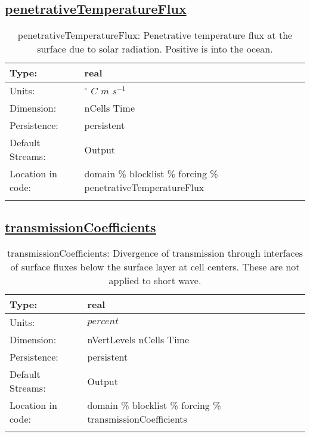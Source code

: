 \subsection[penetrativeTemperatureFlux]{\hyperref[sec:var_tab_forcing]{penetrativeTemperatureFlux}}
\label{subsec:var_sec_forcing_penetrativeTemperatureFlux}
\begin{center}
\begin{longtable}{| p{2.0in} | p{4.0in} |}
        \hline 
        Type: & real \\
        \hline 
        Units: & $^\circ$ $C$ $m$ $s^{-1}$ \\
        \hline 
        Dimension: & nCells Time \\
        \hline 
        Persistence: & persistent \\
        \hline 
		 Default Streams: & Output  \\
        \hline 
		 Location in code: & domain \% blocklist \% forcing \% penetrativeTemperatureFlux \\
		 \hline 
    \caption{penetrativeTemperatureFlux: Penetrative temperature flux at the surface due to solar radiation. Positive is into the ocean.}
\end{longtable}
\end{center}
\subsection[transmissionCoefficients]{\hyperref[sec:var_tab_forcing]{transmissionCoefficients}}
\label{subsec:var_sec_forcing_transmissionCoefficients}
\begin{center}
\begin{longtable}{| p{2.0in} | p{4.0in} |}
        \hline 
        Type: & real \\
        \hline 
        Units: & $percent$ \\
        \hline 
        Dimension: & nVertLevels nCells Time \\
        \hline 
        Persistence: & persistent \\
        \hline 
		 Default Streams: & Output  \\
        \hline 
		 Location in code: & domain \% blocklist \% forcing \% transmissionCoefficients \\
		 \hline 
    \caption{transmissionCoefficients: Divergence of transmission through interfaces of surface fluxes below the surface layer at cell centers. These are not applied to short wave.}
\end{longtable}
\end{center}
